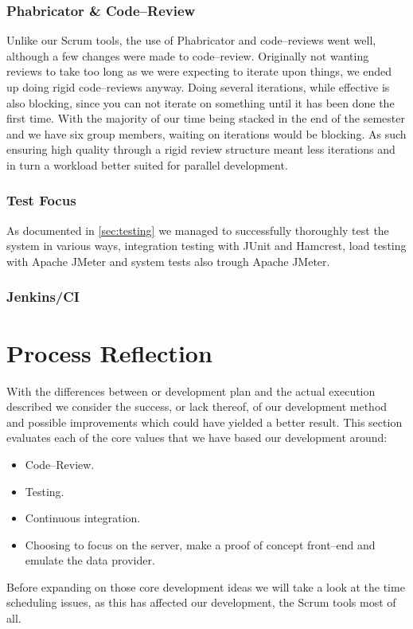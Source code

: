 \subsubsection{Phabricator \& Code--Review}
Unlike our Scrum tools, the use of Phabricator and code--reviews went well, although a few changes were made to code--review.
Originally not wanting reviews to take too long as we were expecting to iterate upon things, we ended up doing rigid code--reviews anyway.
Doing several iterations, while effective is also blocking, since you can not iterate on something until it has been done the first time.
With the majority of our time being stacked in the end of the semester and we have six group members, waiting on iterations would be blocking.
As such ensuring high quality through a rigid review structure meant less iterations and in turn a workload better suited for parallel development.
\subsubsection{Test Focus}
As documented in \cref{sec:testing} we managed to successfully thoroughly test the system in various ways, integration testing with JUnit and Hamcrest, load testing with Apache JMeter and system tests also trough Apache JMeter.
\subsubsection{Jenkins/CI}
\section{Process Reflection}
With the differences between or development plan and the actual execution described we consider the success, or lack thereof, of our development method and possible improvements which could have yielded a better result.
This section evaluates each of the core values that we have based our development around:
\begin{itemize}
    \item Code--Review.
    \item Testing.
    \item Continuous integration.
    \item Choosing to focus on the server, make a proof of concept front--end and emulate the data provider.
\end{itemize}
Before expanding on those core development ideas we will take a look at the time scheduling issues, as this has affected our development, the Scrum tools most of all.
